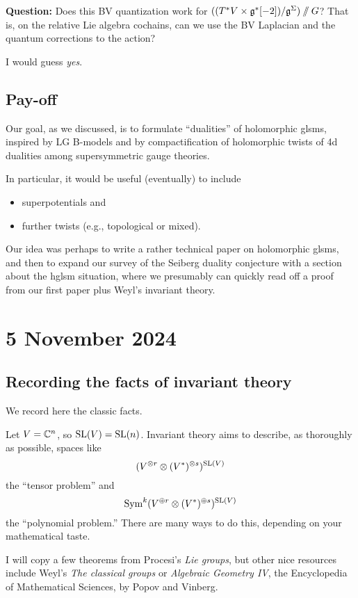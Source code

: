 \documentclass[11pt]{amsart}
\begin{document}
{\bf Question:} Does this BV quantization work for $((T^* V \times \mathfrak g^*[-2])/\mathfrak g^\Sigma)\mathbin{/\mkern-6mu/} G$? That is, on the relative Lie algebra cochains, can we use the BV Laplacian and the quantum corrections to the action?

I would guess {\it yes}.

\subsection{Pay-off}

Our goal, as we discussed, is to formulate ``dualities'' of holomorphic glsms, 
inspired by LG B-models and by compactification of holomorphic twists of 4d dualities among supersymmetric gauge theories.

In particular, it would be useful (eventually) to include
\begin{itemize}
\item superpotentials and
\item further twists (e.g., topological or mixed).
\end{itemize}
Our idea was perhaps to write a rather technical paper on holomorphic glsms, 
and then to expand our survey of the Seiberg duality conjecture with a section about the hglsm situation, where we presumably can quickly read off a proof from our first paper plus Weyl's invariant theory. 

\section{5 November 2024}

\subsection{Recording the facts of invariant theory}

We record here the classic facts.

Let $V = \mathbb C^n$, so $\operatorname{SL}(V) = \operatorname{SL}(n)$. 
Invariant theory aims to describe, as thoroughly as possible, spaces like
\[
(V^{\otimes r} \otimes (V^*)^{\otimes s})^{\operatorname{SL}(V)}
\]
the ``tensor problem'' and
\[
\operatorname{Sym}^k(V^{\oplus r} \otimes (V^*)^{\oplus s})^{\operatorname{SL}(V)}
\]
the ``polynomial problem.''
There are many ways to do this, depending on your mathematical taste.

I will copy a few theorems from Procesi's {\it Lie groups}, but other nice resources include Weyl's {\it The classical groups} or {\it Algebraic Geometry IV}, the Encyclopedia of Mathematical Sciences, by Popov and Vinberg.
\end{document}
